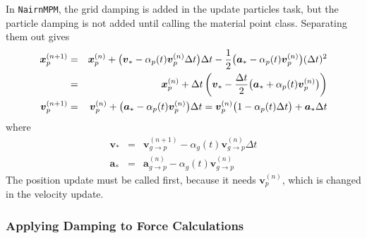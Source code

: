 \documentclass[11pt]{article}
\renewcommand{\vec}[1]{\boldsymbol{#1}}
\begin{document}
In {\tt NairnMPM}, the grid damping is added in the update particles task, but the particle damping is not added until calling the material point class. Separating them out gives
\begin{eqnarray}
   \vec{x}_{p}^{(n+1)} & = & \vec{x}_p^{(n)} +\bigl(\vec v_* - \alpha_p(t)\vec{v}_p^{(n)}\Delta t\bigr)\Delta t - {1\over 2}\bigl(\vec{a}_* -  \alpha_p(t)\vec{v}_p^{(n)} \bigr)(\Delta t)^2  \\
      & = & \vec{x}_p^{(n)} +\Delta t\left(\vec v_* - {\Delta t\over 2}\bigl(\vec{a}_* +  \alpha_p(t)\vec{v}_p^{(n)} \bigr)\right)  \\
   \vec{v}_{p}^{(n+1)} & = & \vec{v}_p^{(n)} +\bigl(\vec{a}_* -  \alpha_p(t)\vec{v}_p^{(n)} \bigr)\Delta t 
           =  \vec{v}_p^{(n)}\bigl(1 -  \alpha_p(t)\Delta t \bigr)  + \vec{a}_* \Delta t
\end{eqnarray}
where
\begin{eqnarray}
   \vec{v}_*& = & \vec v_{g\to p}^{(n+1)} -  \alpha_g(t)\vec{v}_{g\to p}^{(n)}\Delta t   \\
   \vec{a}_* & = & \vec{a}_{g\to p}^{(n)} -  \alpha_g(t)\vec{v}_{g\to p}^{(n)} 
\end{eqnarray}
The position update must be called first, because it needs $\vec{v}_p^{(n)}$, which is changed in the velocity update.

\subsubsection{Applying Damping to Force Calculations}
\end{document}
